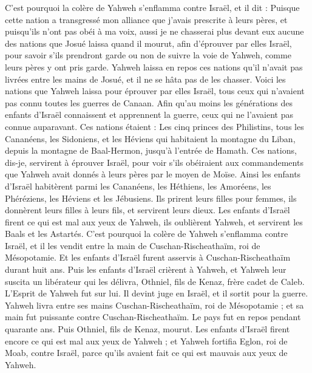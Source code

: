 \begin{multicols}{2}
C'est pourquoi la colère de Yahweh s'enflamma contre Israël, et il dit : Puisque cette nation a transgressé mon alliance que j'avais prescrite à leurs pères, et puisqu’ils n'ont pas obéi à ma voix,
aussi je ne chasserai plus devant eux aucune des nations que Josué laissa quand il mourut,
afin d'éprouver par elles Israël, pour savoir s'ils prendront garde ou non de suivre la voie de Yahweh, comme leurs pères y ont pris garde.
Yahweh laissa en repos ces nations qu'il n'avait pas livrées entre les mains de Josué, et il ne se hâta pas de les chasser.
\VerseOne{}Voici les nations que Yahweh laissa pour éprouver par elles Israël, tous ceux qui n'avaient pas connu toutes les guerres de Canaan.
Afin qu’au moins les générations des enfants d'Israël connaissent et apprennent la guerre, ceux qui ne l’avaient pas connue auparavant.
Ces nations étaient : Les cinq princes des Philistins, tous les Cananéens, les Sidoniens, et les Héviens qui habitaient la montagne du Liban, depuis la montagne de Baal-Hermon, jusqu'à l'entrée de Hamath.
Ces nations, dis-je, servirent à éprouver Israël, pour voir s'ils obéiraient aux commandements que Yahweh avait donnés à leurs pères par le moyen de Moïse.
Ainsi les enfants d'Israël habitèrent parmi les Cananéens, les Héthiens, les Amoréens, les Phéréziens, les Héviens et les Jébusiens.
Ils prirent leurs filles pour femmes, ils donnèrent leurs filles à leurs fils, et servirent leurs dieux.
Les enfants d'Israël firent ce qui est mal aux yeux de Yahweh, ils oublièrent Yahweh, et servirent les Baals et les Astartés.
C'est pourquoi la colère de Yahweh s'enflamma contre Israël, et il les vendit entre la main de Cuschan-Rischeathaïm, roi de Mésopotamie. Et les enfants d'Israël furent asservis à Cuschan-Rischeathaïm durant huit ans.
Puis les enfants d'Israël crièrent à Yahweh, et Yahweh leur suscita un libérateur qui les délivra, Othniel, fils de Kenaz, frère cadet de Caleb.
L’Esprit de Yahweh fut sur lui. Il devint juge en Israël, et il sortit pour la guerre. Yahweh livra entre ses mains Cuschan-Rischeathaïm, roi de Mésopotamie ; et sa main fut puissante contre Cuschan-Rischeathaïm.
Le pays fut en repos pendant quarante ans. Puis Othniel, fils de Kenaz, mourut.
Les enfants d'Israël firent encore ce qui est mal aux yeux de Yahweh ; et Yahweh fortifia Eglon, roi de Moab, contre Israël, parce qu'ils avaient fait ce qui est mauvais aux yeux de Yahweh.

\end{multicols}
